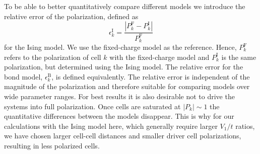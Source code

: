 To be able to better quantitatively compare different models we introduce the
relative error of the polarization, defined as
%
\begin{equation}
  \epsilon^\text{I}_k
  = 
  \frac{\left|P^\text{F}_k - P^\text{I}_k\right|}{P^\text{F}_k}
\end{equation}
%
for the Ising model. We use the fixed-charge model as the reference. Hence,
$P^\text{F}_k$ refers to the polarization of cell $k$ with the fixed-charge
model and $P^\text{I}_k$ is the same polarization, but determined using the Ising
model. The relative error for the bond model, $\epsilon^\text{B}_k$, is defined
equivalently. The relative error is independent of the magnitude of the
polarization and therefore suitable for comparing models over wide parameter
ranges. For best results it is also desirable not to drive the systems
into full polarization. Once cells are saturated at $\left| P_k \right| \sim 1$
the quantitative differences between the models disappear. This is why for our
calculations with the Ising model here, which generally require larger $V_1/t$
ratios, we have chosen larger cell-cell distances and smaller driver cell
polarizations, resulting in less polarized cells.

